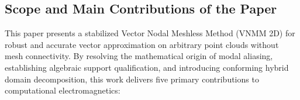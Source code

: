 \documentclass[preprint,12pt]{elsarticle}
\begin{document}
\subsection{Scope and Main Contributions of the Paper}
\label{subsec:scope_contributions}
This paper presents a stabilized Vector Nodal Meshless Method (VNMM 2D) for robust and accurate vector approximation on arbitrary point clouds without mesh connectivity. By resolving the mathematical origin of modal aliasing, establishing algebraic support qualification, and introducing conforming hybrid domain decomposition, this work delivers five primary contributions to computational electromagnetics:
\end{document}

